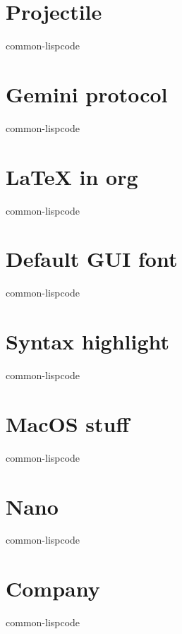\documentclass[11pt]{article}
\begin{document}
\section{Projectile}
\label{sec:orgbfabf61}
common-lispcode
\section{Gemini protocol}
\label{sec:orgd247535}
common-lispcode
\section{\LaTeX{} in org}
\label{sec:org2306289}
common-lispcode
\section{Default GUI font}
\label{sec:org7382b07}
common-lispcode
\section{Syntax highlight}
\label{sec:orgb2ea190}
common-lispcode
\section{MacOS stuff}
\label{sec:org8cd7697}
common-lispcode
\section{Nano}
\label{sec:orgaaf8eae}
common-lispcode
\section{Company}
\label{sec:orgd34449f}
common-lispcode
\end{document}
